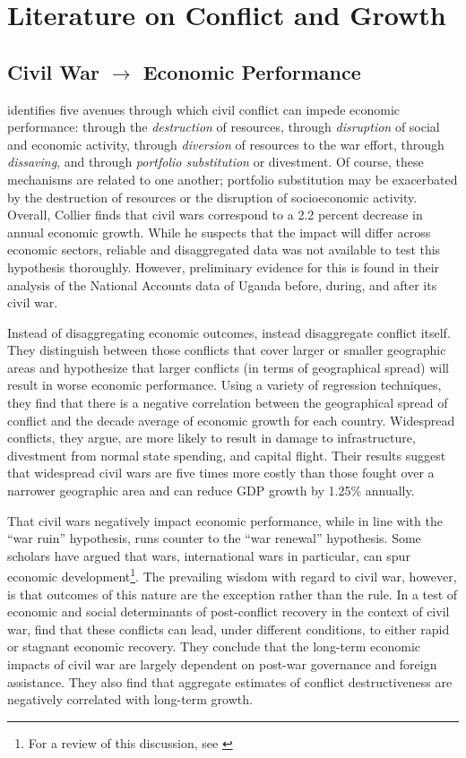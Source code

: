 
\section{Literature on Conflict and Growth}
\label{lit}

\subsection{Civil War $\rightarrow$ Economic Performance}

\citet{collier:1999} identifies five avenues through which civil conflict can impede economic performance: through the \textit{destruction} of resources, through \textit{disruption} of social and economic activity, through \textit{diversion} of resources to the war effort, through \textit{dissaving}, and through \textit{portfolio substitution} or divestment. Of course, these mechanisms are related to one another; portfolio substitution may be exacerbated by the destruction of resources or the disruption of socioeconomic activity. Overall, Collier finds that civil wars correspond to a 2.2 percent decrease in annual economic growth. While he suspects that the impact will differ across economic sectors, reliable and disaggregated data was not available to test this hypothesis thoroughly. However, preliminary evidence for this is found in their analysis of the National Accounts data of Uganda before, during, and after its civil war.

Instead of disaggregating economic outcomes, \citet{imai:weinstein:2000} instead disaggregate conflict itself. They distinguish between those conflicts that cover larger or smaller geographic areas and hypothesize that larger conflicts (in terms of geographical spread) will result in worse economic performance. Using a variety of regression techniques, they find that there is a negative correlation between the geographical spread of conflict and the decade average of economic growth for each country. Widespread conflicts, they argue, are more likely to result in damage to infrastructure, divestment from normal state spending, and capital flight. Their results suggest that widespread civil wars are five times more costly than those fought over a narrower geographic area and can reduce GDP growth by 1.25\% annually.

That civil wars negatively impact economic performance, while in line with the ``war ruin'' hypothesis, runs counter to the ``war renewal'' hypothesis. Some scholars have argued that wars, international wars in particular, can spur economic development\footnote{For a review of this discussion, see \citet{rasler:thompson:1985}}. The prevailing wisdom with regard to civil war, however, is that outcomes of this nature are the exception rather than the rule. In a test of economic and social determinants of post-conflict recovery in the context of civil war, \citet{kang:meernik:2005} find that these conflicts can lead, under different conditions, to either rapid or stagnant economic recovery. They conclude that the long-term economic impacts of civil war are largely dependent on post-war governance and foreign assistance. They also find that aggregate estimates of conflict destructiveness are negatively correlated with long-term growth.

